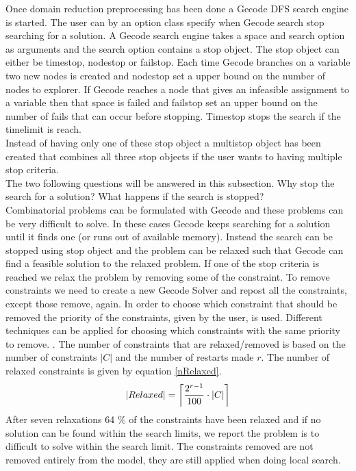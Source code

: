 Once domain reduction preprocessing has been done a Gecode DFS search engine is started. The user can by an option 
class specify when Gecode search stop searching for a solution. A Gecode search engine takes a space and search option 
as arguments and the search option contains a stop object. The stop object can either be timestop, nodestop or 
failstop. Each time Gecode branches on a variable two new nodes is created and nodestop set a upper bound on the number 
of nodes to explorer. If Gecode reaches a node that gives an infeasible assignment to a variable then that space is 
failed and failstop set an upper bound on the number of fails that can occur before stopping. Timestop stops the search 
if the timelimit is reach. \\ 
Instead of having only one of these stop object a multistop object has been created that combines all three stop 
objects if the user wants to having multiple stop criteria. \\ 
The two following questions will be answered in this subsection. Why stop the search for a solution? What happens if the 
search is stopped? \\ 
Combinatorial problems can be formulated with Gecode and these problems can be very difficult to solve. In these cases 
Gecode keeps searching for a solution until it finds one (or runs out of available memory). Instead the search can be 
stopped using stop object and the problem can be relaxed such that Gecode can find a feasible solution to the relaxed 
problem. If one of the stop criteria is reached we relax the problem by removing some of the constraint. To remove 
constraints we need to create a new Gecode Solver and repost all the constraints, except those remove, again. In order 
to choose which constraint that should be removed the priority of the constraints, given by the user, is used. 
Different techniques can be applied for choosing which constraints with the same priority to remove. . The number of constraints that 
are relaxed/removed is based on the number of constraints $|C|$ and the number of restarts made $r$. The number of 
relaxed constraints is given by equation \ref{nRelaxed}. 
\begin{equation}
 |Relaxed| = \ceil[\bigg]{\frac{2^{r-1}}{100}\cdot |C|}
 \label{nRelaxed}
\end{equation} 
After seven relaxations 64 \% of the constraints have been relaxed and if no solution can be found within the search 
limits, we report the problem is to difficult to solve within the search limit. 
The constraints 
removed are not removed entirely from the model, they are still applied when doing local search.   